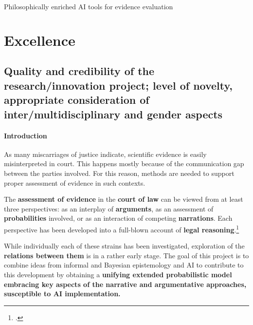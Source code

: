 \documentclass[11pt, a4paper]{article}
\begin{document}
\begin{center}
\Large{Philosophically enriched AI tools for evidence evaluation}
\end{center}

\vspace{-6mm}



\section{Excellence}

\vspace{-4mm}




\subsection{Quality and credibility of the research/innovation project; level of novelty, appropriate consideration of inter/multidisciplinary and gender aspects}


\vspace{-2mm}

\paragraph{Introduction}

As many miscarriages of justice indicate, scientific evidence is easily misinterpreted in court. This happens mostly because of the communication gap between the parties involved.  For this reason, methods are needed to  support   proper assessment of evidence in such contexts.

The \textbf{assessment of evidence} in the \textbf{court of law} can be viewed from at least three  perspectives: as an interplay of \textbf{arguments}, as an assessment of  \textbf{probabilities} involved, or as an interaction of competing \textbf{narrations}. Each  perspective has been developed into a full-blown account of  \textbf{ legal reasoning}.\footcite{di2018evidential,vanEemeren2017}

While individually each of these strains has been investigated, exploration of  the \textbf{relations between them} is in a rather early stage.
The goal of this project is to combine ideas from informal and  Bayesian epistemology and AI to contribute to this development  by obtaining a \textbf{unifying extended probabilistic model embracing key aspects of the narrative and argumentative approaches, susceptible to AI implementation.}  
\end{document}
